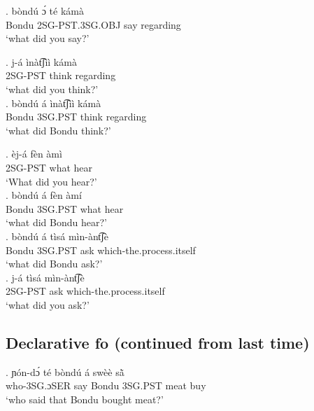 \documentclass{assets/fieldnotes}
\begin{document}
\exg. bòndú ɔ́ té kámà\\
Bondu 2SG-PST.3SG.OBJ say regarding\\
`what did you say?' \\


\exg. j-á ìnàt͡ʃìì kámà\\
2SG-PST think regarding\\
`what did you think?' \\

\exg. bòndú á ìnàt͡ʃìì kámà\\
Bondu 3SG.PST think regarding\\
`what did Bondu think?' \\


\exg. èj-á fèn àmì\\
2SG-PST what hear\\
`What did you hear?' \\

\exg. bòndú á fèn àmí\\
Bondu 3SG.PST what hear\\
`what did Bondu hear?' \\


\exg. bòndú á tìsá mìn-ànt͡ʃè\\
Bondu 3SG.PST ask which-the.process.itself\\
`what did Bondu ask?' \\

\exg. j-á tìsá mìn-ànt͡ʃè\\
2SG-PST ask which-the.process.itself\\
`what did you ask?' \\




\subsection{Declarative fo (continued from last time)}
\exg. ɲón-dɔ́ té bòndú á swèè sã̀\\
who-3SG.ɔSER say Bondu 3SG.PST meat buy\\
`who said that Bondu bought meat?' \\
\end{document}
